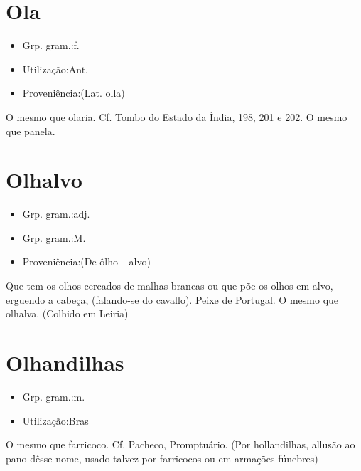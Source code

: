 \section{Ola}
\begin{itemize}
\item {Grp. gram.:f.}
\end{itemize}
\begin{itemize}
\item {Utilização:Ant.}
\end{itemize}
\begin{itemize}
\item {Proveniência:(Lat. \textunderscore olla\textunderscore )}
\end{itemize}
O mesmo que \textunderscore olaria\textunderscore . Cf. \textunderscore Tombo do Estado da Índia\textunderscore , 198, 201 e 202.
O mesmo que \textunderscore panela\textunderscore .
\section{Olhalvo}
\begin{itemize}
\item {Grp. gram.:adj.}
\end{itemize}
\begin{itemize}
\item {Grp. gram.:M.}
\end{itemize}
\begin{itemize}
\item {Proveniência:(De \textunderscore ôlho\textunderscore  + \textunderscore alvo\textunderscore )}
\end{itemize}
Que tem os olhos cercados de malhas brancas ou que põe os olhos em alvo, erguendo a cabeça, (falando-se do cavallo).
Peixe de Portugal.
O mesmo que \textunderscore olhalva\textunderscore . (Colhido em Leiria)
\section{Olhandilhas}
\begin{itemize}
\item {Grp. gram.:m.}
\end{itemize}
\begin{itemize}
\item {Utilização:Bras}
\end{itemize}
O mesmo que \textunderscore farricoco\textunderscore . Cf. Pacheco, Promptuário.
(Por \textunderscore hollandilhas\textunderscore , allusão ao pano dêsse nome, usado talvez por farricocos ou em armações fúnebres)
